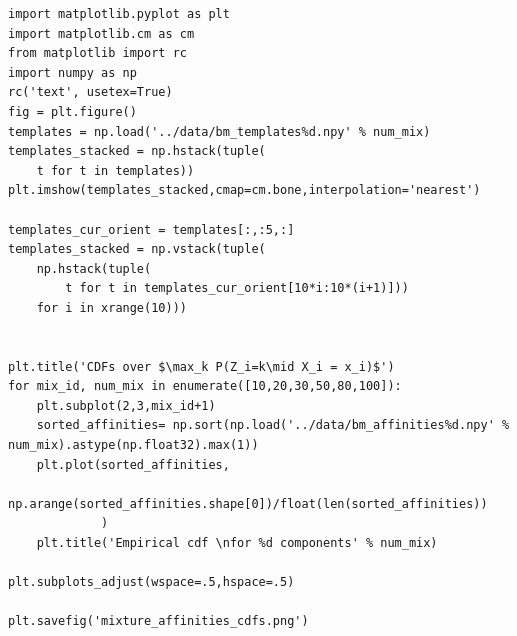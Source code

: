 \documentclass[11pt]{article}
\begin{document}
\begin{verbatim}
import matplotlib.pyplot as plt
import matplotlib.cm as cm
from matplotlib import rc
import numpy as np
rc('text', usetex=True)
fig = plt.figure()
templates = np.load('../data/bm_templates%d.npy' % num_mix)
templates_stacked = np.hstack(tuple(
    t for t in templates))
plt.imshow(templates_stacked,cmap=cm.bone,interpolation='nearest')

templates_cur_orient = templates[:,:5,:]
templates_stacked = np.vstack(tuple(
    np.hstack(tuple(
        t for t in templates_cur_orient[10*i:10*(i+1)]))
    for i in xrange(10)))


plt.title('CDFs over $\max_k P(Z_i=k\mid X_i = x_i)$')
for mix_id, num_mix in enumerate([10,20,30,50,80,100]):
    plt.subplot(2,3,mix_id+1)
    sorted_affinities= np.sort(np.load('../data/bm_affinities%d.npy' % num_mix).astype(np.float32).max(1))
    plt.plot(sorted_affinities,
             np.arange(sorted_affinities.shape[0])/float(len(sorted_affinities))
             )
    plt.title('Empirical cdf \nfor %d components' % num_mix)

plt.subplots_adjust(wspace=.5,hspace=.5)

plt.savefig('mixture_affinities_cdfs.png')
\end{verbatim}
\end{document}
